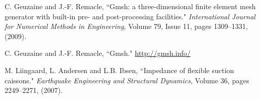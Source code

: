 \documentclass[a4]{article}
\begin{document}
\FloatBarrier

\begin{thebibliography}{99}
	
	 C. Geuzaine and J.-F. Remacle, ``Gmsh: a three-dimensional finite element mesh generator with built-in pre- and post-processing facilities." \textit{International Journal for Numerical Methods in Engineering}, Volume 79, Issue 11, pages 1309--1331, (2009).
	
	 C. Geuzaine and J.-F. Remacle, ``Gmsh." \url{http://gmsh.info/}
	
	 M. Liingaard, L. Andersen and L.B. Ibsen, ``Impedance of flexible suction caissons." \textit{Earthquake Engineering and Structural Dynamics}, Volume 36, pages 2249--2271, (2007).

\end{thebibliography}
\end{document}
